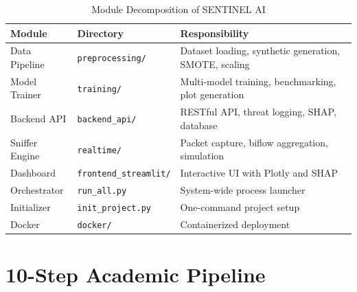 \begin{table}[H]
\centering
\caption{Module Decomposition of SENTINEL AI}
\label{tab:modules}
\begin{tabular}{l l p{6.5cm}}
\toprule
\textbf{Module} & \textbf{Directory} & \textbf{Responsibility} \\
\midrule
Data Pipeline & \texttt{preprocessing/} & Dataset loading, synthetic generation, SMOTE, scaling \\
Model Trainer & \texttt{training/} & Multi-model training, benchmarking, plot generation \\
Backend API & \texttt{backend\_api/} & RESTful API, threat logging, SHAP, database \\
Sniffer Engine & \texttt{realtime/} & Packet capture, biflow aggregation, simulation \\
Dashboard & \texttt{frontend\_streamlit/} & Interactive UI with Plotly and SHAP \\
Orchestrator & \texttt{run\_all.py} & System-wide process launcher \\
Initializer & \texttt{init\_project.py} & One-command project setup \\
Docker & \texttt{docker/} & Containerized deployment \\
\bottomrule
\end{tabular}
\end{table}

\section{10-Step Academic Pipeline}

